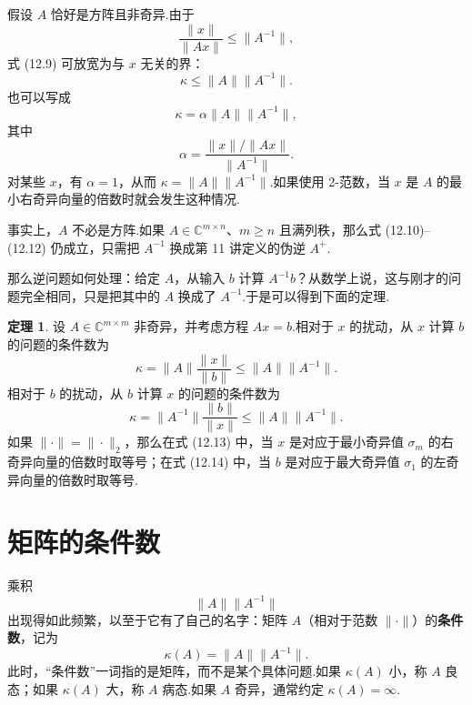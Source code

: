 \documentclass[UTF8,fontset=none,12pt]{ctexart}
\newcommand{\C}{\mathbb{C}}
\theoremstyle{definition}
\newtheorem{theorem}{定理}
\begin{document}
假设 $A$ 恰好是方阵且非奇异.由于
\[
    \frac{\|x\|}{\|Ax\|}\le\|A^{-1}\|,
\]
式 (12.9) 可放宽为与 $x$ 无关的界：
\begin{equation}
    \kappa\le\|A\|\|A^{-1}\|.
    \tag{12.10}
\end{equation}
也可以写成
\begin{equation}
    \kappa=\alpha\|A\|\|A^{-1}\|,
    \tag{12.11}
\end{equation}
其中
\begin{equation}
    \alpha=
    \frac{\|x\|/\|Ax\|}{\|A^{-1}\|}.
    \tag{12.12}
\end{equation}
对某些 $x$，有 $\alpha=1$，从而 $\kappa=\|A\|\|A^{-1}\|$.如果使用 2-范数，当 $x$ 是 $A$ 的最小右奇异向量的倍数时就会发生这种情况.

事实上，$A$ 不必是方阵.如果 $A\in\C^{m\times n}$、$m\ge n$ 且满列秩，那么式 (12.10)--(12.12) 仍成立，只需把 $A^{-1}$ 换成第 11 讲定义的伪逆 $A^+$.

那么逆问题如何处理：给定 $A$，从输入 $b$ 计算 $A^{-1}b$？从数学上说，这与刚才的问题完全相同，只是把其中的 $A$ 换成了 $A^{-1}$.于是可以得到下面的定理.

\begin{theorem}
设 $A\in\C^{m\times m}$ 非奇异，并考虑方程 $Ax=b$.相对于 $x$ 的扰动，从 $x$ 计算 $b$ 的问题的条件数为
\begin{equation}
    \kappa=\|A\|\frac{\|x\|}{\|b\|}
    \le\|A\|\|A^{-1}\|.
    \tag{12.13}
\end{equation}
相对于 $b$ 的扰动，从 $b$ 计算 $x$ 的问题的条件数为
\begin{equation}
    \kappa=\|A^{-1}\|\frac{\|b\|}{\|x\|}
    \le\|A\|\|A^{-1}\|.
    \tag{12.14}
\end{equation}
如果 $\|\cdot\|=\|\cdot\|_2$，那么在式 (12.13) 中，当 $x$ 是对应于最小奇异值 $\sigma_m$ 的右奇异向量的倍数时取等号；在式 (12.14) 中，当 $b$ 是对应于最大奇异值 $\sigma_1$ 的左奇异向量的倍数时取等号.
\end{theorem}

\section*{矩阵的条件数}

乘积
\[
    \|A\|\|A^{-1}\|
\]
出现得如此频繁，以至于它有了自己的名字：矩阵 $A$（相对于范数 $\|\cdot\|$）的\textbf{条件数}，记为
\begin{equation}
    \kappa(A)=\|A\|\|A^{-1}\|.
    \tag{12.15}
\end{equation}
此时，“条件数”一词指的是矩阵，而不是某个具体问题.如果 $\kappa(A)$ 小，称 $A$ 良态；如果 $\kappa(A)$ 大，称 $A$ 病态.如果 $A$ 奇异，通常约定 $\kappa(A)=\infty$.
\end{document}
